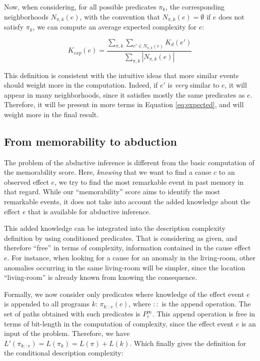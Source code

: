 \documentclass[conference]{IEEEtran}
\begin{document}
Now, when considering, for all possible predicates $\pi_k$, the corresponding
neighborhoods $N_{\pi, k}(e)$, with the convention that $N_{\pi, k}(e) = \emptyset$
if $e$ does not satisfy $\pi_k$, we can compute an average expected complexity for $e$:

\begin{equation}
\label{eq:expected}
K_{exp}(e) = \frac{
\sum_{\pi, k} \sum_{e' \in N_{\pi, k}(e)} K_d(e')
                  }{
\sum_{\pi, k} |N_{\pi, k}(e)|
                  }
\end{equation}

This definition is consistent with the intuitive ideas that more similar events should weight more in the computation. Indeed, if $e'$
is \emph{very} similar to $e$, it will appear in many neighborhoods, since it
satisfies mostly the same predicates as $e$. Therefore, it will
be present in more terms in Equation \ref{eq:expected}, and will weight more in
the final result.

\subsection{From memorability to abduction}
The problem of the abductive inference is different from the basic computation
of the memorability score. Here, \emph{knowing} that we want to find a cause $c$
to an observed effect $e$, we try to find the most remarkable event in past
memory in that regard. While our ``memorability'' score aims to identify the
most remarkable events, it does not take into account the added knowledge about
the effect $e$ that is available for abductive inference.

This added knowledge can be integrated into the description complexity definition by using conditioned predicates. That is considering as given, and therefore ``free'' in terms of complexity, information contained in the cause effect $e$. For instance, when looking for a cause for
an anomaly in the living-room, other anomalies occurring in the same
living-room will be simpler, since the location ``living-room'' is already known
from knowing the consequence.

Formally, we now consider only predicates where knowledge of the effect event $e$  is appended to all programs $k$:
$\pi_{k::e}(c)$, where $::$ is the append operation. The set of paths obtained with such predicates is $P^\infty_e$. This append operation is free in terms of bit-length in the computation of complexity, since the effect event $e$ is an input of the problem. Therefore, we have $L'(\pi_{k::e}) = L(\pi_k) = L(\pi) + L(k)$. Which finally gives the definition for the conditional description complexity:
\end{document}

